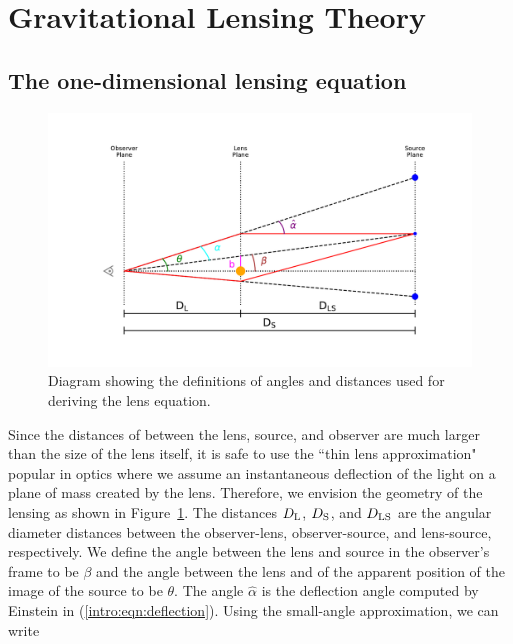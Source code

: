 
\section{Gravitational Lensing Theory}

\subsection{The one-dimensional lensing equation}

\begin{figure}
\includegraphics[width=\textwidth, trim=75pt 75pt 75pt 75pt]{Intro/lens_diagram.pdf}
\caption[Diagram of gravitational lensing parameters]{Diagram showing the definitions of angles and distances used for deriving the lens equation.}
\label{intro:fig:diagram}
\end{figure}

Since the distances of between the lens, source, and observer are much larger than the size of the lens itself, it is safe to use the ``thin lens approximation" popular in optics where we assume an instantaneous deflection of the light on a plane of mass created by the lens. Therefore, we envision the geometry of the lensing as shown in Figure~\ref{intro:fig:diagram}. The distances $D_\mathrm{L}$, $D_\mathrm{S}$, and $D_\mathrm{LS}$ are the angular diameter distances between the observer-lens, observer-source, and lens-source, respectively. We define the angle between the lens and source in the observer's frame to be $\beta$ and the angle between the lens and of the apparent position of the image of the source to be $\theta$. The angle $\hat\alpha$ is the deflection angle computed by Einstein in (\ref{intro:eqn:deflection}). Using the small-angle approximation, we can write

